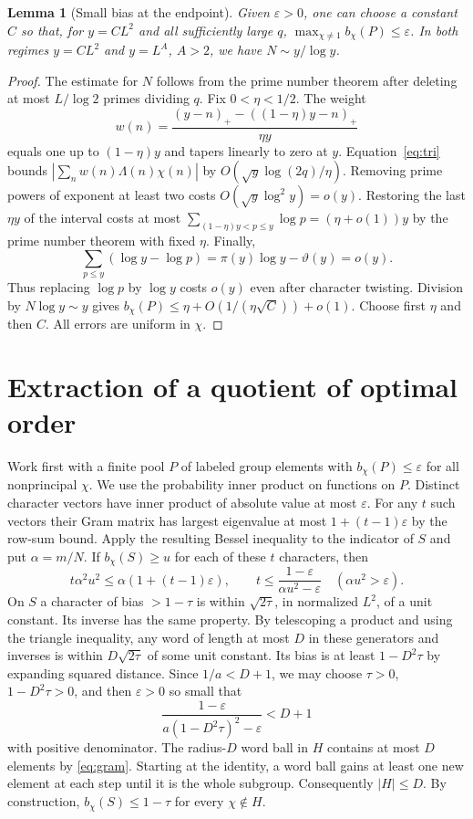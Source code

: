 \documentclass[11pt]{article}
\newtheorem{lemma}[theorem]{Lemma}
\renewcommand{\epsilon}{\varepsilon}
\begin{document}
\begin{lemma}[Small bias at the endpoint]\label{lem:analytic}
Given $\epsilon>0$, one can choose a constant $C$ so that, for $y=C L^2$
and all sufficiently large $q$,
$\max_{\chi\ne1} b_\chi(P)\le\epsilon$.
In both regimes $y=C L^2$ and $y=L^A$, $A>2$, we have $N\sim y/\log y$.
\end{lemma}
\begin{proof}
The estimate for $N$ follows from the prime number theorem after deleting at
most $L/\log 2$ primes dividing $q$. Fix $0<\eta<1/2$. The weight
\[
 w(n)=\frac{(y-n)_+-((1-\eta)y-n)_+}{\eta y}
\]
equals one up to $(1-\eta)y$ and tapers linearly to zero at $y$.
Equation~\eqref{eq:tri} bounds $|\sum_n w(n)\Lambda(n)\chi(n)|$ by
$O(\sqrt y\log(2q)/\eta)$. Removing prime powers of exponent at least two
costs $O(\sqrt y\log^2 y)=o(y)$. Restoring the last $\eta y$ of the interval
costs at most $\sum_{(1-\eta)y<p\le y}\log p=(\eta+o(1))y$ by the prime
number theorem with fixed $\eta$. Finally,
\[
 \sum_{p\le y}(\log y-\log p)=\pi(y)\log y-\vartheta(y)=o(y).
\]
Thus replacing $\log p$ by $\log y$ costs $o(y)$ even after character
twisting. Division by $N\log y\sim y$ gives
$b_\chi(P)\le \eta+O(1/(\eta\sqrt C))+o(1)$. Choose first $\eta$ and then
$C$. All errors are uniform in $\chi$.
\end{proof}

\section{Extraction of a quotient of optimal order}
Work first with a finite pool $P$ of labeled group elements with
$b_\chi(P)\le\epsilon$ for all nonprincipal $\chi$. We use the probability
inner product on functions on $P$. Distinct character vectors have inner
product of absolute value at most $\epsilon$. For any $t$ such vectors
their Gram matrix has largest eigenvalue at most $1+(t-1)\epsilon$ by
the row-sum bound. Apply the resulting Bessel inequality to the indicator
of $S$ and put $\alpha=m/N$. If $b_\chi(S)\ge u$ for each of these $t$
characters, then
\[
 t\alpha^2 u^2\le\alpha(1+(t-1)\epsilon),\qquad
 t\le\frac{1-\epsilon}{\alpha u^2-\epsilon}
 \quad (\alpha u^2>\epsilon).
\tag{G}\label{eq:gram}
\]
On $S$ a character of bias $>1-\tau$ is within $\sqrt{2\tau}$, in
normalized $L^2$, of a unit constant. Its inverse has the same property.
By telescoping a product and using the triangle inequality, any word of
length at most $D$ in these generators and inverses is within
$D\sqrt{2\tau}$ of some unit constant. Its bias is at least
$1-D^2\tau$ by expanding squared distance. Since $1/a<D+1$, we may choose
$\tau>0$, $1-D^2\tau>0$, and then $\epsilon>0$ so small that
\[
 \frac{1-\epsilon}{a(1-D^2\tau)^2-\epsilon}<D+1
\]
with positive denominator. The radius-$D$ word ball in $H$ contains at most
$D$ elements by \eqref{eq:gram}. Starting at the identity, a word ball
gains at least one new element at each step until it is the whole subgroup.
Consequently $|H|\le D$. By construction,
$b_\chi(S)\le1-\tau$ for every $\chi\notin H$.
\end{document}
